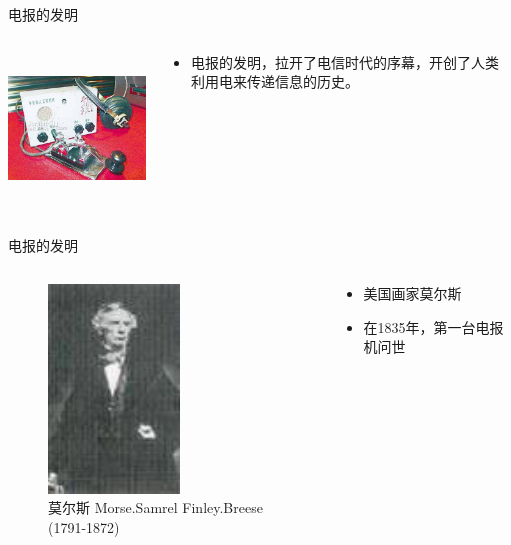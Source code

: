 \documentclass{beamer}
\begin{document}
\begin{frame}{电报的发明}
  \begin{columns}
    \begin{column}{0.5\linewidth}
      \includegraphics[height=4cm]{dianbao}
    \end{column}
    \begin{column}{0.5\linewidth}
      \begin{itemize}
        \item 电报的发明，拉开了电信时代的序幕，开创了人类利用电来传递信息的历史。
      \end{itemize}
    \end{column}
  \end{columns}
\end{frame}

\begin{frame}{电报的发明}
  \begin{columns}
    \begin{column}{0.5\linewidth}
    \begin{figure}
      \includegraphics[width=3.5cm]{Morse.jpg}
      \caption{莫尔斯 Morse.Samrel Finley.Breese (1791-1872)}\label{Morse}
    \end{figure}
    \end{column}
    \begin{column}{0.5\linewidth}
      \begin{itemize}
        \item 美国画家莫尔斯
        \item 在1835年，第一台电报机问世
      \end{itemize}
    \end{column}
  \end{columns}
\end{frame}
\end{document}
